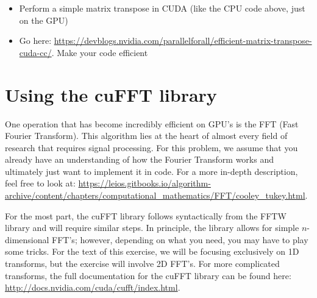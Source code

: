 \documentclass[11pt]{article}
\begin{document}
\begin{itemize}
\item Perform a simple matrix transpose in CUDA (like the CPU code above, just on the GPU)
\item Go here: \sloppy \url{https://devblogs.nvidia.com/parallelforall/efficient-matrix-transpose-cuda-cc/}. Make your code efficient
\end{itemize}

\newpage

\section*{Using the cuFFT library}

One operation that has become incredibly efficient on GPU's is the FFT (Fast Fourier Transform). This algorithm lies at the heart of almost every field of research that requires signal processing. For this problem, we assume that you already have an understanding of how the Fourier Transform works and ultimately just want to implement it in code. For a more in-depth description, feel free to look at: \url{https://leios.gitbooks.io/algorithm-archive/content/chapters/computational_mathematics/FFT/cooley_tukey.html}.

For the most part, the cuFFT library follows syntactically from the FFTW library and will require similar steps. In principle, the library allows for simple $n$-dimensional FFT's; however, depending on what you need, you may have to play some tricks. For the text of this exercise, we will be focusing exclusively on 1D transforms, but the exercise will involve 2D FFT's. For more complicated transforms, the full documentation for the cuFFT library can be found here: \url{http://docs.nvidia.com/cuda/cufft/index.html}.
\end{document}
